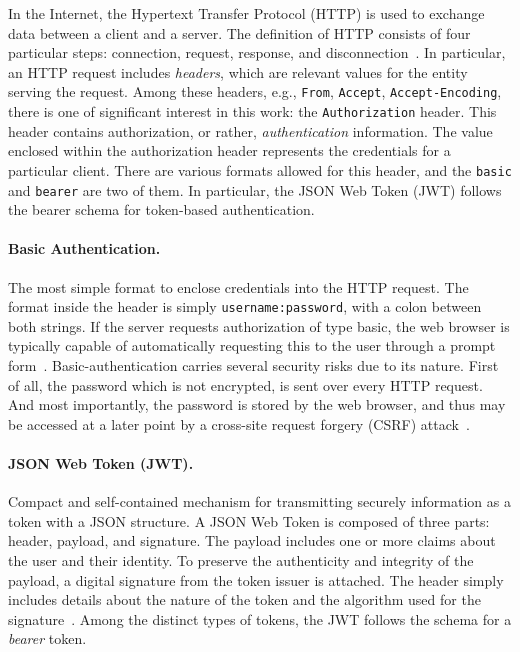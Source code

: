 \documentclass[12pt]{article}
\begin{document}
In the Internet, the Hypertext Transfer Protocol (HTTP) is used to exchange data between a client and a server. The definition of HTTP consists of four particular steps: connection, request, response, and disconnection~\cite{RFC2616}. In particular, an HTTP request includes \emph{headers}, which are relevant values for the entity serving the request. Among these headers, e.g., \texttt{From}, \texttt{Accept}, \texttt{Accept-Encoding}, there is one of significant interest in this work: the \texttt{Authorization} header. This header contains authorization, or rather, \emph{authentication} information. The value enclosed within the authorization header represents the credentials for a particular client. There are various formats allowed for this header, and the \texttt{basic} and \texttt{bearer} are two of them. In particular, the JSON Web Token (JWT) follows the bearer schema for token-based authentication.

\paragraph{Basic Authentication.} The most simple format to enclose credentials into the HTTP request. The format inside the header is simply \texttt{username:password}, with a colon between both strings. If the server requests authorization of type basic, the web browser is typically capable of automatically requesting this to the user through a prompt form~\cite{RFC7617}. Basic-authentication carries several security risks due to its nature. First of all, the password which is not encrypted, is sent over every HTTP request. And most importantly, the password is stored by the web browser, and thus may be accessed at a later point by a cross-site request forgery (CSRF) attack~\cite{basic_01}.

\paragraph{JSON Web Token (JWT).} Compact and self-contained mechanism for transmitting securely information as a token with a JSON structure. A JSON Web Token is composed of three parts: header, payload, and signature. The payload includes one or more claims about the user and their identity. To preserve the authenticity and integrity of the payload, a digital signature from the token issuer is attached. The header simply includes details about the nature of the token and the algorithm used for the signature~\cite{RFC7519}. Among the distinct types of tokens, the JWT follows the schema for a \emph{bearer} token. 
\end{document}

